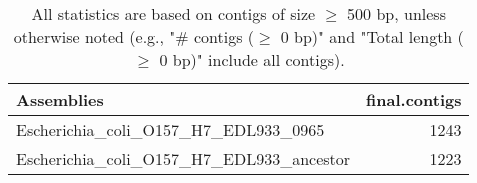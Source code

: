 \documentclass[12pt,a4paper]{article}
\begin{document}
\begin{table}[ht]
\begin{center}
\caption{All statistics are based on contigs of size $\geq$ 500 bp, unless otherwise noted (e.g., "\# contigs ($\geq$ 0 bp)" and "Total length ($\geq$ 0 bp)" include all contigs).}
\begin{tabular}{|l*{1}{|r}|}
\hline
Assemblies & final.contigs \\ \hline
Escherichia\_coli\_O157\_H7\_EDL933\_0965 & 1243 \\ \hline
Escherichia\_coli\_O157\_H7\_EDL933\_ancestor & 1223 \\ \hline
\end{tabular}
\end{center}
\end{table}
\end{document}

